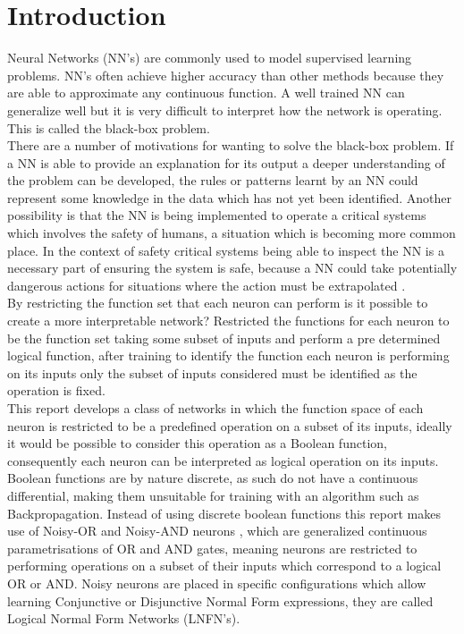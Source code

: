 \chapter{Introduction}\label{C:intro}
Neural Networks (NN's) are commonly used to model supervised learning problems. NN's often achieve higher accuracy than other methods because they are able to approximate any continuous function. A well trained NN can generalize well but it is very difficult to interpret how the network is operating. This is called the black-box problem. \\

There are a number of motivations for wanting to solve the black-box problem. If a NN is able to provide an explanation for its output a deeper understanding of the problem can be developed, the rules or patterns learnt by an NN could represent some knowledge in the data which has not yet been identified. Another possibility is that the NN is being implemented to operate a critical systems which involves the safety of humans, a situation which is becoming more common place. In the context of safety critical systems being able to inspect the NN is a necessary part of ensuring the system is safe, because a NN could take potentially dangerous actions for situations where the action must be extrapolated \cite{andrews1995survey}.\\

By restricting the function set that each neuron can perform is it possible to create a more interpretable network? Restricted the functions for each neuron to be the function set taking some subset of inputs and perform a pre determined logical function, after training to identify the function each neuron is performing on its inputs only the subset of inputs considered must be identified as the operation is fixed.\\

This report develops a class of networks in which the function space of each neuron is restricted to be a predefined operation on a subset of its inputs, ideally it would be possible to consider this operation as a Boolean function, consequently each neuron can be interpreted as logical operation on its inputs. Boolean functions are by nature discrete, as such do not have a continuous differential, making them unsuitable for training with an algorithm such as Backpropagation. Instead of using discrete boolean functions this report makes use of Noisy-OR and Noisy-AND neurons \cite{LearningLogicalActivations}, which are generalized continuous parametrisations of OR and AND gates, meaning neurons are restricted to performing operations on a subset of their inputs which correspond to a logical OR or AND. Noisy neurons are placed in specific configurations which allow learning Conjunctive or Disjunctive Normal Form expressions, they are called Logical Normal Form Networks (LNFN's).\\

